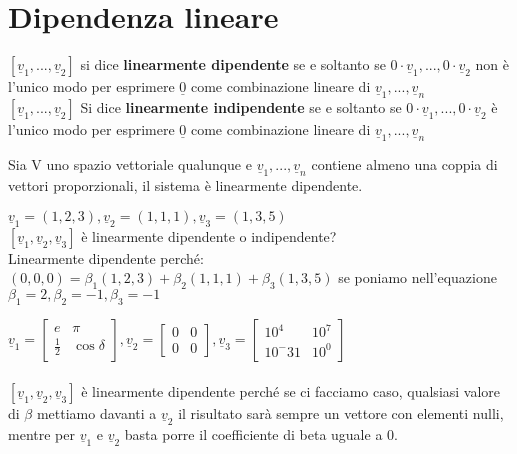 \section{Dipendenza lineare}
$[\underline{v}_1,...,\underline{v}_2]$ si dice \textbf{linearmente dipendente} se e soltanto se $0\cdot \underline{v}_1,...,0\cdot \underline{v}_2$ non è l'unico modo per esprimere $\underline{0}$ come combinazione lineare di $\underline{v}_1,...,\underline{v}_n$\\
$[\underline{v}_1,...,\underline{v}_2]$ Si dice \textbf{linearmente indipendente} se e soltanto se $0\cdot \underline{v}_1,...,0\cdot \underline{v}_2$ è l'unico modo per esprimere $\underline{0}$ come combinazione lineare di $\underline{v}_1,...,\underline{v}_n$
\begin{proposizione}
	Sia V uno spazio vettoriale qualunque e $\underline{v}_1,...,\underline{v}_n$ contiene almeno una coppia di vettori proporzionali, il sistema è linearmente dipendente.
\end{proposizione}

\begin{es}
	$\underline{v}_1=(1,2,3),\underline{v}_2=(1,1,1),\underline{v}_3=(1,3,5)$\\
	$[\underline{v}_1,\underline{v}_2,\underline{v}_3]$ è linearmente dipendente o indipendente?\\
	Linearmente dipendente perché: $(0,0,0)=\beta_1(1,2,3)+\beta_2(1,1,1)+\beta_3(1,3,5)$ se poniamo nell'equazione $\beta_1=2,\beta_2=-1,\beta_3=-1$
\end{es}

\begin{es}
	$\underline{v}_1=\begin{bmatrix}
		e           & \pi\\
		\frac{1}{2} & \cos \delta
	\end{bmatrix}, \underline{v}_2=\begin{bmatrix}
		0 & 0\\
		0 & 0
	\end{bmatrix}, \underline{v}_3=\begin{bmatrix}
		10^4   & 10^7\\
		10^-31 & 10^0
	\end{bmatrix}$\\\\
	$[\underline{v}_1,\underline{v}_2,\underline{v}_3]$ è linearmente dipendente perché se ci facciamo caso, qualsiasi valore di $\beta$ mettiamo davanti a $\underline{v}_2$ il risultato sarà sempre un vettore con elementi nulli, mentre per $\underline{v}_1$ e $\underline{v}_2$ basta porre il coefficiente di beta uguale a 0.
\end{es}

